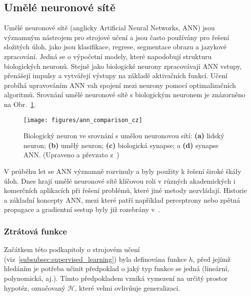 \subsection{Umělé neuronové sítě}
Umělé neuronové sítě (anglicky Artificial Neural Networks, \gls{ANN}) jsou
významným nástrojem pro strojové učení a jsou často používány pro řešení
složitých úloh, jako jsou klasifikace, regrese, segmentace obrazu a jazykové
zpracování. Jedná se o výpočetní modely, které napodobují strukturu biologických
neuronů. Stejně jako biologické neurony zpracovávají \gls{ANN} vstupy, přenášejí
impulsy a vytvářejí výstupy na základě aktivačních funkcí. Učení probíhá
upravováním ANN vah spojení mezi neurony pomocí optimalizačních algoritmů.
Srovnání umělé neuronové sítě s biologickým neuronem je znázorněno na
Obr.~\ref{fig:ann_comparison}.

\begin{figure}[!htb]
    \begin{center}
        \texttt{[image: figures/ann\_comparison\_cz]}
        \caption{Biologický neuron ve srovnání s umělou neuronovou sítí: \textbf{(a)}
            lidský neuron; \textbf{(b)} umělý neuron; \textbf{(c)} biologická
            synapse; a \textbf{(d)} synapse ANN. (Upraveno a převzato
            z~\cite{suzuki2013})}
        \label{fig:ann_comparison}
    \end{center}
\end{figure}

V průběhu let se \gls{ANN} významně rozvinuly a byly použity k řešení široké
škály úloh. Dnes hrají umělé neuronové sítě klíčovou roli v různých akademických
i komerčních aplikacích při řešení problémů, které jiné metody nezvládají.
Historie a základní koncepty \gls{ANN}, mezi které patří například perceptrony
nebo zpětná propagace a gradientní sestup byly již rozebrány
v~\cite{Aurelien2022,Murphy2012,Goodfellow2016}.

\subsubsection{Ztrátová funkce}
Začátkem této podkapitoly o strojovém učení
(viz~\ref{subsubsec:supervised_learning}) byla definována funkce $h$, před
jejímž hledáním je potřeba učinit předpoklad o jaký typ funkce se jedná
(lineární, polynomická, aj.). Tímto předpokladem vzniká vymezení na určitý
prostor hypotéz, označovaný $\mathcal{H}$, které velmi ovlivňuje generalizaci.

